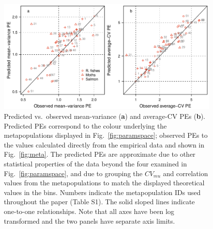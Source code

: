 \begin{figure}[htbp]
  \centering
  \includegraphics[width=\textwidth]{prophets/parameter-space-predicted-vs-observed-20120430.pdf}
  \caption{ Predicted vs.\ observed mean-variance (\textbf{a}) and average-CV
    PEs (\textbf{b}).  Predicted PEs correspond to the colour underlying the
    metapopulations displayed in Fig.~\ref{fig:paramspace}; observed PEs to
    the values calculated directly from the empirical data and shown in
    Fig.~\ref{fig:meta}. The predicted PEs are approximate due to other
    statistical properties of the data beyond the four examined in
    Fig.~\ref{fig:paramspace}, and due to grouping the $CV_{mu}$ and
    correlation values from the metapopulations to match the displayed
    theoretical values in the bins.  Numbers indicate the metapopulation IDs
    used throughout the paper (Table S1).  The solid sloped lines indicate
    one-to-one relationships.  Note that all axes have been log transformed
    and the two panels have separate axis limits.  }
  \label{fig:PE-predicted-observed}
\end{figure}

